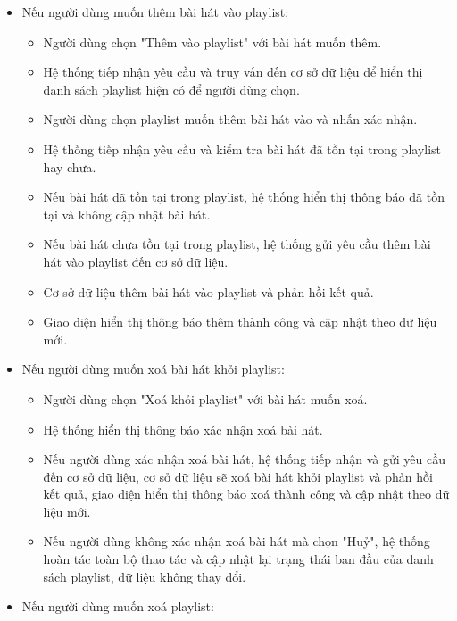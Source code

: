\documentclass[a4paper]{article}
\begin{document}
\begin{itemize}
\begin{enumerate}
\begin{itemize}
			            \item Nếu người dùng muốn thêm bài hát vào playlist:
			                  \begin{itemize}
				                  \item Người dùng chọn "Thêm vào playlist" với bài hát muốn thêm.
				                  \item Hệ thống tiếp nhận yêu cầu và truy vấn đến cơ sở dữ liệu để hiển thị danh sách playlist hiện có để người dùng chọn.
				                  \item Người dùng chọn playlist muốn thêm bài hát vào và nhấn xác nhận.
				                  \item Hệ thống tiếp nhận yêu cầu và kiểm tra bài hát đã tồn tại trong playlist hay chưa.
                          \item Nếu bài hát đã tồn tại trong playlist, hệ thống hiển thị thông báo đã tồn tại và không cập nhật bài hát.
                          \item Nếu bài hát chưa tồn tại trong playlist, hệ thống gửi yêu cầu thêm bài hát vào playlist đến cơ sở dữ liệu.
				                  \item Cơ sở dữ liệu thêm bài hát vào playlist và phản hồi kết quả.
				                  \item Giao diện hiển thị thông báo thêm thành công và cập nhật theo dữ liệu mới.
			                  \end{itemize}
			            \item Nếu người dùng muốn xoá bài hát khỏi playlist:
			                  \begin{itemize}
				                  \item Người dùng chọn "Xoá khỏi playlist" với bài hát muốn xoá.
                          \item Hệ thống hiển thị thông báo xác nhận xoá bài hát.
                          \item Nếu người dùng xác nhận xoá bài hát, hệ thống tiếp nhận và gửi yêu cầu đến cơ sở dữ liệu, cơ sở dữ liệu sẽ xoá bài hát khỏi playlist và phản hồi kết quả, giao diện hiển thị thông báo xoá thành công và cập nhật theo dữ liệu mới.
                          \item Nếu người dùng không xác nhận xoá bài hát mà chọn "Huỷ", hệ thống hoàn tác toàn bộ thao tác và cập nhật lại trạng thái ban đầu của danh sách playlist, dữ liệu không thay đổi.
			                  \end{itemize}
                  \item Nếu người dùng muốn xoá playlist:

\end{itemize}
\end{enumerate}
\end{itemize}
\end{document}
